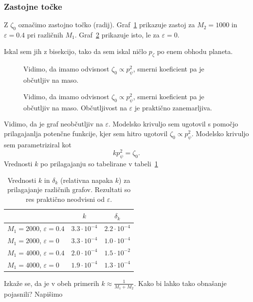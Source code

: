 \documentclass[12pt, a4paper]{article}
\begin{document}
\subsubsection{Zastojne to\v cke}
Z $\zeta_0$ ozna\v cimo zastojno to\v cko (radij). Graf~\ref{fig:zastoj1} prikazuje zastoj za $M_2 = 1000$ in
$\varepsilon = 0.4$ pri razli\v cnih $M_1$. Graf~\ref{fig:zastoj2} prikazuje isto, le za $\varepsilon = 0$.

Iskal sem jih z bisekcijo, tako da sem iskal ni\v clo $p_\zeta$ po enem obhodu planeta.
\begin{figure}[H]\centering
	
	\caption{Vidimo, da imamo odvisnost $\zeta_0 \propto p_\psi^2$, smerni koeficient pa je ob\v cutljiv na maso.}
	\label{fig:zastoj1}
\end{figure}

\begin{figure}[H]\centering
	
	\caption{Vidimo, da imamo odvisnost $\zeta_0 \propto p_\psi^2$, smerni koeficient pa je ob\v cutljiv na maso.
		Ob\v cutljivost na $\varepsilon$ je prakti\v cno zanemarljiva.}
	\label{fig:zastoj2}
\end{figure}
Vidimo, da je graf neob\v cutljiv na $\varepsilon$. Modelsko krivuljo sem ugotovil s pomo\v cjo prilagajanlja poten\v cne
funkcije, kjer sem hitro ugotovil $\zeta_0 \propto p_\psi^2$. Modelsko krivuljo sem parametriziral kot
\begin{equation}
	kp_\psi^2 = \zeta_0.
\end{equation}
Vrednosti $k$ po prilagajanju so tabelirane v tabeli~\ref{tab:fit1}
\begin{table}[H]\centering
	\caption{Vrednosti $k$ in $\delta_k$ (relativna napaka $k$) za prilagajanje razli\v cnih grafov. Rezultati
		so res prakti\v cno neodvisni od $\varepsilon$.}
	\begin{tabular}{l|c|c}
		& $k$ & $\delta_k$ \\
		\hline \hline
		$M_1 = 2000$, $\varepsilon = 0.4$ & $3.3\cdot10^{-4}$ & $2.2\cdot10^{-4}$ \\
		$M_1 = 2000$, $\varepsilon = 0$   & $3.3\cdot10^{-4}$ & $1.0\cdot10^{-4}$ \\
		\hline
		$M_1 = 4000$, $\varepsilon = 0.4$ & $2.0\cdot10^{-4}$ & $1.5\cdot10^{-2}$ \\
		$M_1 = 4000$, $\varepsilon = 0$   & $1.9\cdot10^{-4}$ & $1.3\cdot10^{-4}$
	\end{tabular}
	\label{tab:fit1}
\end{table}
Izka\v ze se, da je v obeh primerih $k \approx \frac{1}{M_1 + M_2}$. Kako bi lahko tako obna\v sanje pojasnili? Napi\v simo
\end{document}
